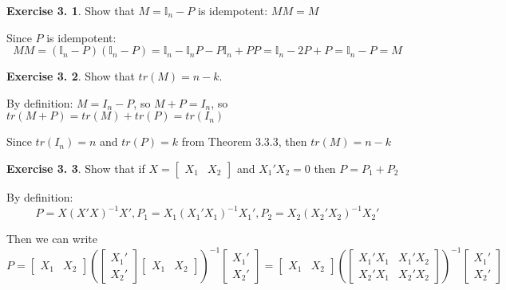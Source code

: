 \documentclass[12pt,letterpaper,reqno]{amsart}
\newcommand{\I}{\mathbb I}
\theoremstyle{plain}
\theoremstyle{definition}
\theoremstyle{definition}
\newtheorem{Exercise}{Exercise 3.}
\numberwithin{equation}{section}
\begin{document}
\begin{Exercise} Show that $M = \I_n - P$ is idempotent: $MM=M$

    Since $P$ is idempotent: 
    \[
        MM = (\I_n - P)(\I_n - P) = \I_n - \I_nP - P\I_n + PP = \I_n - 2P + P = \I_n - P = M
    \]
\end{Exercise}

\begin{Exercise} Show that $tr(M) = n - k$.

    By definition: $M = I_n - P$, so $M+P=I_n$, so $tr(M+P)=tr(M)+tr(P)=tr(I_n)$
    
    Since $tr(I_n) = n$ and $tr(P)=k$ from Theorem 3.3.3, then $tr(M) = n - k $
\end{Exercise}

\begin{Exercise} Show that if $X = \begin{bmatrix} X_1 & X_2 \end{bmatrix}$ and $X_1'X_2=0$ then $P=P_1+P_2$

    By definition: 
    \[
        P = X(X'X)^{-1}X', P_1 = X_1(X_1'X_1)^{-1}X_1', P_2 = X_2(X_2'X_2)^{-1}X_2'
    \]
    
    Then we can write 
    \[
        P = \begin{bmatrix} X_1 & X_2 \end{bmatrix} (\begin{bmatrix} X_1' \\ X_2' \end{bmatrix} 
     \begin{bmatrix} X_1 & X_2 \end{bmatrix})^{-1} \begin{bmatrix} X_1' \\ X_2' \end{bmatrix} = \begin{bmatrix} X_1 & X_2 \end{bmatrix} (\begin{bmatrix} X_1'X_1 & X_1'X_2 \\ X_2'X_1 & X_2'X_2 \end{bmatrix} 
     )^{-1} \begin{bmatrix} X_1' \\ X_2' \end{bmatrix}
    \]
    

\end{Exercise}
\end{document}
